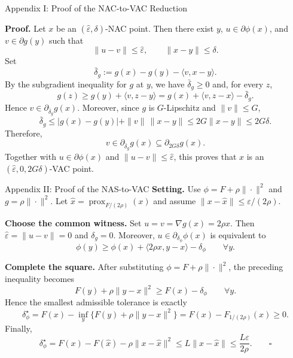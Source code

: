 \documentclass[10pt]{beamer}
\newif\ifshowappendix
\begin{document}
\ifshowappendix
\appendix
\begin{frame}{Appendix I: Proof of the NAC-to-VAC Reduction}
\footnotesize

\textbf{Proof.}
Let $x$ be an $(\widehat\varepsilon,\delta)$-NAC point. Then there
exist $y$, $u\in\partial\phi(x)$, and $v\in\partial g(y)$ such that
\[
    \|u-v\|\le\widehat\varepsilon,
    \qquad
    \|x-y\|\le\delta.
\]
Set
\[
    \bar\delta_g
    :=g(x)-g(y)-\langle v,x-y\rangle.
\]
By the subgradient inequality for $g$ at $y$, we have
$\bar\delta_g\ge0$ and, for every $z$,
\[
    g(z)
    \ge g(y)+\langle v,z-y\rangle
    =g(x)+\langle v,z-x\rangle-\bar\delta_g.
\]
Hence $v\in\partial_{\bar\delta_g}g(x)$. Moreover, since $g$ is
$G$-Lipschitz and $\|v\|\le G$,
\[
    \bar\delta_g
    \le |g(x)-g(y)|+\|v\|\,\|x-y\|
    \le 2G\|x-y\|
    \le 2G\delta.
\]
Therefore,
\[
    v\in\partial_{\bar\delta_g}g(x)
    \subseteq\partial_{2G\delta}g(x).
\]
Together with $u\in\partial\phi(x)$ and
$\|u-v\|\le\widehat\varepsilon$, this proves that $x$ is an
$(\widehat\varepsilon,0,2G\delta)$-VAC point.
\end{frame}

\begin{frame}{Appendix II: Proof of the NAS-to-VAC}
\footnotesize
\textbf{Setting.}
Use $\phi=F+\rho\|\cdot\|^2$ and $g=\rho\|\cdot\|^2$.
Let $\hat x=\operatorname{prox}_{F/(2\rho)}(x)$ and assume
$\|x-\hat x\|\le\varepsilon/(2\rho)$.

\medskip
\textbf{Choose the common witness.}
Set $u=v=\nabla g(x)=2\rho x$.
Then $\widehat\varepsilon=\|u-v\|=0$ and $\delta_g=0$.
Moreover, $u\in\partial_{\delta_\phi}\phi(x)$ is equivalent to
\[
    \phi(y)\ge\phi(x)+\langle2\rho x,y-x\rangle-\delta_\phi
    \qquad\forall y.
\]

\medskip
\textbf{Complete the square.}
After substituting $\phi=F+\rho\|\cdot\|^2$, the preceding inequality becomes
\[
    F(y)+\rho\|y-x\|^2\ge F(x)-\delta_\phi
    \qquad\forall y.
\]
Hence the smallest admissible tolerance is exactly
\[
    \delta_\phi^\star
    =F(x)-\inf_y\{F(y)+\rho\|y-x\|^2\}
    =F(x)-F_{1/(2\rho)}(x)\ge0.
\]
Finally,
\[
    \delta_\phi^\star
    =F(x)-F(\hat x)-\rho\|x-\hat x\|^2
    \le L\|x-\hat x\| 
    \le\frac{L\varepsilon}{2\rho}.
    \qquad\square
\]
\end{frame}
\end{document}
